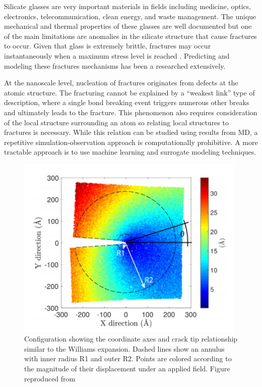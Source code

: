 Silicate glasses are very important materials in fields including medicine, optics, electronics, telecommunication, clean energy, and waste management. The unique mechanical and thermal properties of these glasses are well documented but one of the main limitations are anomalies in the silicate structure that cause fractures to occur. Given that glass is extremely brittle, fractures may occur instantaneously when a maximum stress level is reached \cite{pedone2015dynamics}. Predicting and modeling these fractures mechanisms has been a researched extensively.

At the nanoscale level, nucleation of fractures originates from defects at the atomic structure. The fracturing cannot be explained by a “weakest link” type of description, where a single bond breaking event triggers numerous other breaks and ultimately leads to the fracture. This phenomenon also requires consideration of the local structure surrounding an atom so relating local structures to fractures is necessary. While this relation can be studied using results from MD, a repetitive simulation-observation approach is computationally prohibitive. A more tractable approach is to use machine learning and surrogate modeling techniques.


\begin{figure}[!b]
  \centering
  \includegraphics[width=11cm]{picture/FractureMechanism2.PNG}
  \caption{Configuration showing the coordinate axes and crack tip relationship similar to the Williams expansion. Dashed lines show an annulus
with inner radius R1 and outer R2. Points are colored according to the magnitude of their displacement under an applied field. Figure reproduced from~\protect\cite{mWilson_continuum_stress}} 
  \label{crack_rad2}
\end{figure}



